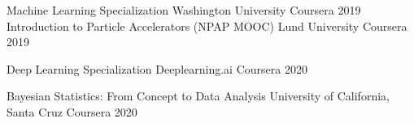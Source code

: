 

\begin{cvhonors}
  \cvhonor
        {Machine Learning Specialization} %
  {Washington University Coursera} %
    {} %
    {2019} %
    \cvhonor
        {Introduction to Particle Accelerators (NPAP MOOC)} %
  {Lund University Coursera} %
    {} %
    {2019} %

        \cvhonor
        {Deep Learning Specialization} %
        {Deeplearning.ai Coursera} %
    {} %
    {2020} %
    
            \cvhonor
            {Bayesian Statistics: From Concept to Data Analysis} %
        {University of California, Santa Cruz Coursera} %
    {} %
    {2020} %


     
    

\end{cvhonors}
